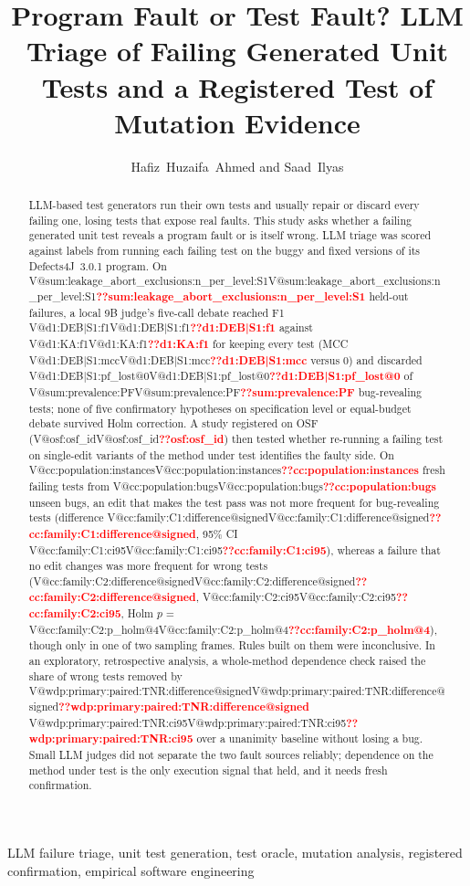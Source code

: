 \documentclass[journal]{IEEEtran}
\makeatletter
\newcommand{\V}[1]{\ifcsname V@#1\endcsname\csname V@#1\endcsname\else\textbf{\textcolor{red}{??#1}}\fi}
\makeatother
\begin{document}
\title{Program Fault or Test Fault? LLM Triage of Failing Generated Unit Tests and a Registered Test of Mutation Evidence}

\author{Hafiz~Huzaifa~Ahmed and Saad~Ilyas}

\maketitle

\begin{abstract}
LLM-based test generators run their own tests and usually repair or discard every failing one, losing tests that expose real faults. This study asks whether a failing generated unit test reveals a program fault or is itself wrong. LLM triage was scored against labels from running each failing test on the buggy and fixed versions of its Defects4J~3.0.1 program. On \V{sum:leakage_abort_exclusions:n_per_level:S1} held-out failures, a local 9B judge's five-call debate reached F1 \V{d1:DEB|S1:f1} against \V{d1:KA:f1} for keeping every test (MCC \V{d1:DEB|S1:mcc} versus 0) and discarded \V{d1:DEB|S1:pf_lost@0} of \V{sum:prevalence:PF} bug-revealing tests; none of five confirmatory hypotheses on specification level or equal-budget debate survived Holm correction. A study registered on OSF (\V{osf:osf_id}) then tested whether re-running a failing test on single-edit variants of the method under test identifies the faulty side. On \V{cc:population:instances} fresh failing tests from \V{cc:population:bugs} unseen bugs, an edit that makes the test pass was not more frequent for bug-revealing tests (difference \V{cc:family:C1:difference@signed}, 95\% CI \V{cc:family:C1:ci95}), whereas a failure that no edit changes was more frequent for wrong tests (\V{cc:family:C2:difference@signed}, \V{cc:family:C2:ci95}, Holm $p$ = \V{cc:family:C2:p_holm@4}), though only in one of two sampling frames. Rules built on them were inconclusive. In an exploratory, retrospective analysis, a whole-method dependence check raised the share of wrong tests removed by \V{wdp:primary:paired:TNR:difference@signed} \V{wdp:primary:paired:TNR:ci95} over a unanimity baseline without losing a bug. Small LLM judges did not separate the two fault sources reliably; dependence on the method under test is the only execution signal that held, and it needs fresh confirmation.
\end{abstract}

\begin{IEEEkeywords}
LLM failure triage, unit test generation, test oracle, mutation analysis, registered confirmation, empirical software engineering
\end{IEEEkeywords}
\end{document}
